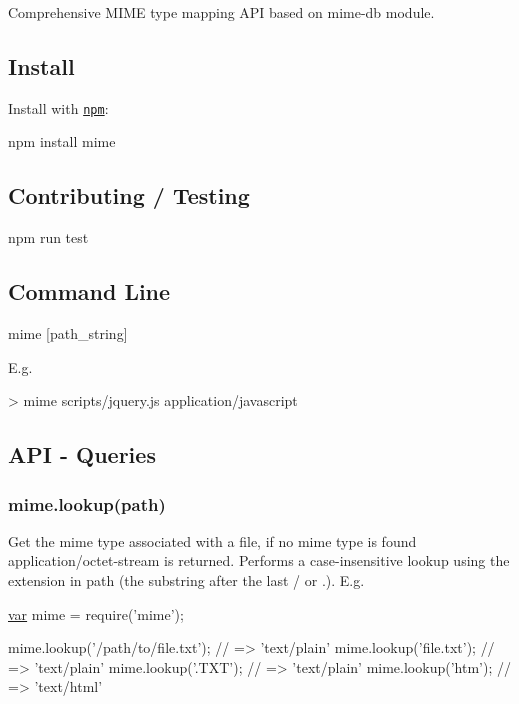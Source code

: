 Comprehensive M\+I\+M\+E type mapping A\+P\+I based on mime-\/db module.

\subsection*{Install}

Install with \href{http://github.com/isaacs/npm}{\tt npm}\+: \begin{DoxyVerb}npm install mime
\end{DoxyVerb}


\subsection*{Contributing / Testing}

\begin{DoxyVerb}npm run test
\end{DoxyVerb}


\subsection*{Command Line}

\begin{DoxyVerb}mime [path_string]
\end{DoxyVerb}


E.\+g. \begin{DoxyVerb}> mime scripts/jquery.js
application/javascript
\end{DoxyVerb}


\subsection*{A\+P\+I -\/ Queries}

\subsubsection*{mime.\+lookup(path)}

Get the mime type associated with a file, if no mime type is found {\ttfamily application/octet-\/stream} is returned. Performs a case-\/insensitive lookup using the extension in {\ttfamily path} (the substring after the last \textquotesingle{}/\textquotesingle{} or \textquotesingle{}.\textquotesingle{}). E.\+g.


\begin{DoxyCode}
\hyperlink{018__def_8c_a335628f2e9085305224b4f9cc6e95ed5}{var} mime = require(\textcolor{stringliteral}{'mime'});

mime.lookup(\textcolor{stringliteral}{'/path/to/file.txt'});         \textcolor{comment}{// => 'text/plain'}
mime.lookup(\textcolor{stringliteral}{'file.txt'});                  \textcolor{comment}{// => 'text/plain'}
mime.lookup(\textcolor{stringliteral}{'.TXT'});                      \textcolor{comment}{// => 'text/plain'}
mime.lookup(\textcolor{stringliteral}{'htm'});                       \textcolor{comment}{// => 'text/html'}
\end{DoxyCode}


